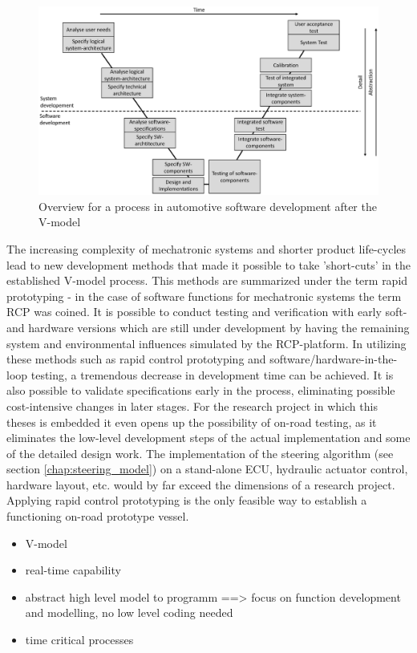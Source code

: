 \documentclass[ExampleMasters.tex]{subfiles}
\begin{document}
\begin{figure}[!htb]
	\centering
	\includegraphics[width=0.9\linewidth]{figures/v_model/Folie1}
	\caption{Overview for a process in automotive software development after the V-model}
	\label{fig:v_model}
\end{figure}



The increasing complexity of mechatronic systems and shorter product life-cycles lead to new development methods that made it possible to take 'short-cuts' in the established V-model process. This methods are summarized under the term rapid prototyping - in the case of software functions for mechatronic systems the term \gls{RCP} was coined. It is possible to conduct testing and verification with early soft- and hardware versions which are still under development by having the remaining system and environmental influences simulated by the \gls{RCP}-platform. In utilizing these methods such as rapid control prototyping and software/hardware-in-the-loop testing, a tremendous decrease in development time can be achieved. It is also possible to validate specifications early in the process, eliminating possible cost-intensive changes in later stages.\cite{rapidcontrolprototyping} For the research project in which this theses is embedded it even opens up the possibility of on-road testing, as it eliminates the low-level development steps of the actual implementation and some of the detailed design work. The implementation of the steering algorithm (see section \ref{chap:steering_model}) on a stand-alone ECU, hydraulic actuator control, hardware layout, etc. would by far exceed the dimensions of a research project. Applying rapid control prototyping is the only feasible way to establish a functioning on-road prototype vessel.


\begin{itemize}
	\item V-model
	\item real-time capability
	\item abstract high level model to programm ==> focus on function development and modelling, no low level coding needed
	\item time critical processes
\end{itemize}
\end{document}
